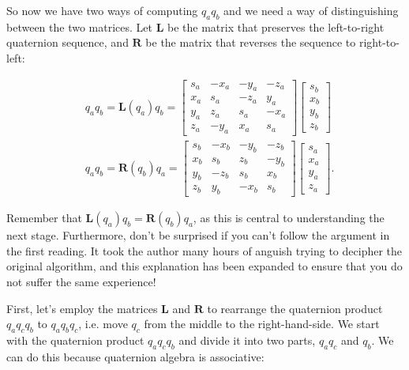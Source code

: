 So now we have two ways of computing $q_{a} q_{b}$ and we need a way of distinguishing between the two matrices. Let $\mathbf{L}$ be the matrix that preserves the left-to-right quaternion sequence, and $\mathbf{R}$ be the matrix that reverses the sequence to right-to-left:

$$
\begin{aligned}
& q_{a} q_{b}=\mathbf{L}\left(q_{a}\right) q_{b}= {\left[\begin{array}{cccc}
s_{a} & -x_{a} & -y_{a} & -z_{a} \\
x_{a} & s_{a} & -z_{a} & y_{a} \\
y_{a} & z_{a} & s_{a} & -x_{a} \\
z_{a} & -y_{a} & x_{a} & s_{a}
\end{array}\right]\left[\begin{array}{c}
s_{b} \\
x_{b} \\
y_{b} \\
z_{b}
\end{array}\right] } \\
& q_{a} q_{b}=\mathbf{R}\left(q_{b}\right) q_{a}=\left[\begin{array}{cccc}
s_{b} & -x_{b} & -y_{b} & -z_{b} \\
x_{b} & s_{b} & z_{b} & -y_{b} \\
y_{b} & -z_{b} & s_{b} & x_{b} \\
z_{b} & y_{b} & -x_{b} & s_{b}
\end{array}\right]\left[\begin{array}{c}
s_{a} \\
x_{a} \\
y_{a} \\
z_{a}
\end{array}\right] .
\end{aligned}
$$

Remember that $\mathbf{L}\left(q_{a}\right) q_{b}=\mathbf{R}\left(q_{b}\right) q_{a}$, as this is central to understanding the next stage. Furthermore, don't be surprised if you can't follow the argument in the first reading. It took the author many hours of anguish trying to decipher the original algorithm, and this explanation has been expanded to ensure that you do not suffer the same experience!

First, let's employ the matrices $\mathbf{L}$ and $\mathbf{R}$ to rearrange the quaternion product $q_{a} q_{c} q_{b}$ to $q_{a} q_{b} q_{c}$, i.e. move $q_{c}$ from the middle to the right-hand-side. We start with the quaternion product $q_{a} q_{c} q_{b}$ and divide it into two parts, $q_{a} q_{c}$ and $q_{b}$. We can do this because quaternion algebra is associative:

